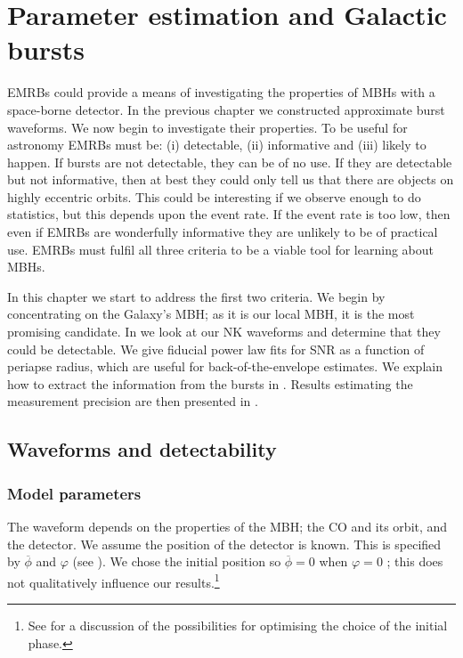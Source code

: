 \chapter{Parameter estimation and Galactic bursts}\label{ch:param}

EMRBs could provide a means of investigating the properties of MBHs with a space-borne detector. In the previous chapter we constructed approximate burst waveforms. We now begin to investigate their properties. To be useful for astronomy EMRBs must be: (i) detectable, (ii) informative and (iii) likely to happen. If bursts are not detectable, they can be of no use. If they are detectable but not informative, then at best they could only tell us that there are objects on highly eccentric orbits. This could be interesting if we observe enough to do statistics, but this depends upon the event rate. If the event rate is too low, then even if EMRBs are wonderfully informative they are unlikely to be of practical use. EMRBs must fulfil all three criteria to be a viable tool for learning about MBHs.

In this chapter we start to address the first two criteria. We begin by concentrating on the Galaxy's MBH; as it is our local MBH, it is the most promising candidate. In  we look at our NK waveforms and determine that they could be detectable. We give fiducial power law fits for SNR as a function of periapse radius, which are useful for back-of-the-envelope estimates. We explain how to extract the information from the bursts in . Results estimating the measurement precision are then presented in .


\section{Waveforms and detectability}\label{sec:Waveforms}

\subsection{Model parameters}\label{sec:Mod-param}

The waveform depends on the properties of the MBH; the CO and its orbit, and the detector. We assume the position of the detector is known. This is specified by $\overline{\phi}$ and $\varphi$ (see ). We chose the initial position so $\overline{\phi} = 0$ when $\varphi = 0$ \citep{Cutler1998}; this does not qualitatively influence our results.\footnote{See \citet{Jani2013} for a discussion of the possibilities for optimising the choice of the initial phase.}

